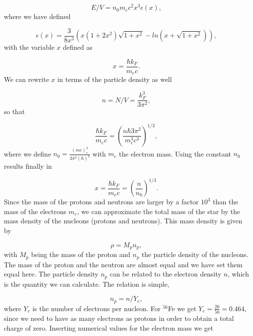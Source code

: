 \documentclass[%
oneside,                 %
final,                   %
10pt]{article}
\begin{document}
\begin{equation*}
E/V=n_0m_ec^2x^3\epsilon (x),
\end{equation*}
where we have defined

\begin{equation*}
\epsilon (x) =
\frac{3}{8x^3}\left( x(1+2x^2)\sqrt{1+x^2}-ln(x+\sqrt{1+x^2})\right),
\end{equation*}
with the variable $x$ defined as

\begin{equation*}
x=\frac{\hbar k_F}{m_ec}.
\end{equation*}
We can rewrite $x$ in terms of the particle density as well

\begin{equation*}
n=N/V=\frac{k_{F}^{3}}{3\pi^{2}},
\end{equation*}
so that

\begin{equation*}
\frac{\hbar k_F}{m_ec}=\left(\frac{n\hbar 3\pi^2}{m_e^3c^3}\right)^{1/3},
\end{equation*}
where we define
$n_{0}=\frac{(mc)^{3}_{e}}{3\pi^2(\hbar)^{3}}$ with $m_{e}$ the electron mass.
Using the constant $n_0$ results finally in

\begin{equation*}
x=\frac{\hbar k_F}{m_ec}=\left(\frac{n}{n_{0}}\right)^{1/3}.
\end{equation*}
Since the mass of the protons and neutrons are larger by a factor $10^3$ than the mass
of the electrons $m_e$, 
we can approximate the total mass of the star by the mass density of the nucleons (protons and neutrons).
This mass density is given by

\begin{equation*}
\rho = M_p n_p,
\end{equation*}
with $M_{p}$ being the  mass of the proton and $n_p$ the particle density of the nucleons.
The mass of the proton and the neutron are almost equal and we have set them equal here.
The particle density  $n_p$ can be related to the electron density $n$, which is the quantity
we can calculate. The relation is simple,

\begin{equation*}
n_p = n/Y_e ,
\end{equation*}
where $Y_{e}$ is the number of electrons per nucleon.  For $^{56}$Fe we get $Y_{e}=\frac{26}{56}=0.464$, since we 
need to have as many electrons as protons in order to obtain a total charge of zero. Inserting numerical values
for the electron mass we get
\end{document}
